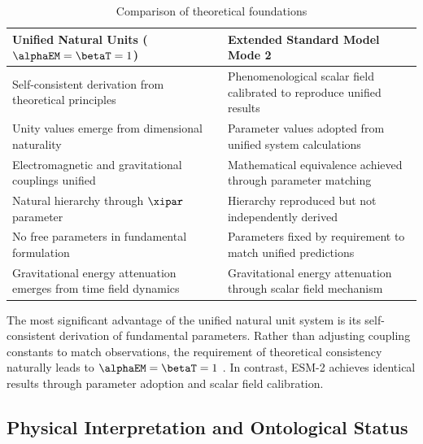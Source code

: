 	\begin{table}[ht]
		\centering
		\caption{Comparison of theoretical foundations}
		\label{tab:theoretical_foundations}
		\begin{tabular}{p{}|p{}}
			\hline
			\textbf{Unified Natural Units ($\alphaEM = \betaT = 1$)} & \textbf{Extended Standard Model Mode 2} \\
			\hline
			Self-consistent derivation from theoretical principles \cite{pascher_unified_2025} & Phenomenological scalar field calibrated to reproduce unified results \\
			\hline
			Unity values emerge from dimensional naturality & Parameter values adopted from unified system calculations \\
			\hline
			Electromagnetic and gravitational couplings unified & Mathematical equivalence achieved through parameter matching \\
			\hline
			Natural hierarchy through $\xipar$ parameter \cite{pascher_beta_derivation_2025} & Hierarchy reproduced but not independently derived \\
			\hline
			No free parameters in fundamental formulation & Parameters fixed by requirement to match unified predictions \\
			\hline
			Gravitational energy attenuation emerges from time field dynamics & Gravitational energy attenuation through scalar field mechanism \\
			\hline
		\end{tabular}
	\end{table}
	
	The most significant advantage of the unified natural unit system is its self-consistent derivation of fundamental parameters. Rather than adjusting coupling constants to match observations, the requirement of theoretical consistency naturally leads to $\alphaEM = \betaT = 1$ \cite{pascher_unified_2025}. In contrast, ESM-2 achieves identical results through parameter adoption and scalar field calibration.
	
	\subsection{Physical Interpretation and Ontological Status}
	\label{subsec:physical_interpretation_ontological}
	
